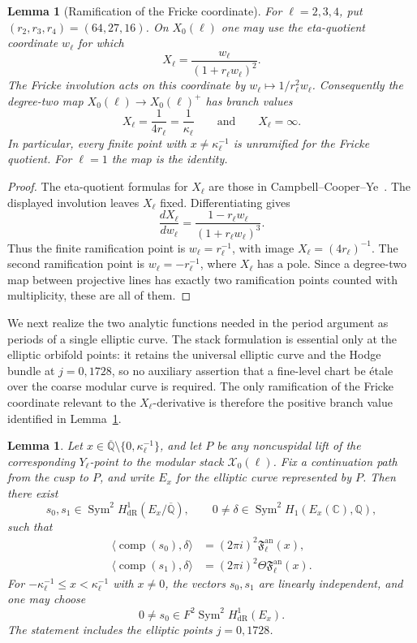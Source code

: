 \documentclass[11pt,a4paper]{amsart} %
\newtheorem{lemma}[theorem]{Lemma}
\theoremstyle{definition}
\newcommand{\Q}{\mathbb Q}
\newcommand{\Qbar}{\overline{\mathbb Q}}
\newcommand{\C}{\mathbb C}
\newcommand{\Sym}{\operatorname{Sym}}
\newcommand{\dR}{\mathrm{dR}}
\begin{document}
\begin{lemma}[Ramification of the Fricke coordinate]\label{lem:frickeram}
For \(\ell=2,3,4\), put $(r_2,r_3,r_4)=(64,27,16)$. On \(X_0(\ell)\) one may use the eta-quotient coordinate \(w_\ell\) for which
\[
X_\ell=\frac{w_\ell}{(1+r_\ell w_\ell)^2}.
\]
The Fricke involution acts on this coordinate by $w_\ell\longmapsto {1}/{r_\ell^2w_\ell}$. Consequently the degree-two map $X_0(\ell)\longrightarrow X_0(\ell)^+$ has branch values
\[
X_\ell=\frac{1}{4r_\ell}=\frac1{\kappa_\ell}
\qquad\text{and}\qquad
X_\ell=\infty.
\]
In particular, every finite point with $x\ne\kappa_\ell^{-1}$ is unramified for the Fricke quotient. For \(\ell=1\) the map is the identity.
\end{lemma}

\begin{proof}
The eta-quotient formulas for \(X_\ell\) are those in
Campbell--Cooper--Ye~\cite[Table~2]{CCY}. The displayed involution leaves
\(X_\ell\) fixed. Differentiating gives
\[
\frac{dX_\ell}{dw_\ell}
=
\frac{1-r_\ell w_\ell}{(1+r_\ell w_\ell)^3}.
\]
Thus the finite ramification point is \(w_\ell=r_\ell^{-1}\), with image
\(X_\ell=(4r_\ell)^{-1}\). The second ramification point is
\(w_\ell=-r_\ell^{-1}\), where \(X_\ell\) has a pole. Since a degree-two map
between projective lines has exactly two ramification points counted with
multiplicity, these are all of them.
\end{proof}

We next realize the two analytic functions needed in the period argument as
periods of a single elliptic curve. The stack formulation is essential only
at the elliptic orbifold points: it retains the universal elliptic curve and
the Hodge bundle at \(j=0,1728\), so no auxiliary assertion that a fine-level
chart be étale over the coarse modular curve is required. The only
ramification of the Fricke coordinate relevant to the \(X_\ell\)-derivative
is therefore the positive branch value identified in
Lemma~\ref{lem:frickeram}.

\begin{lemma}\label{lem:period}
Let \(x\in\Qbar\setminus\{0,\kappa_\ell^{-1}\}\), and let \(P\) be any
noncuspidal lift of the corresponding \(Y_\ell\)-point to the modular stack
\(\mathcal X_0(\ell)\). Fix a continuation path from the cusp to \(P\), and
write \(E_x\) for the elliptic curve represented by \(P\). Then there exist
\[
s_0,s_1\in\Sym^2H^1_{\dR}(E_x/\Qbar),
\qquad
0\ne\delta\in\Sym^2H_1(E_x(\C),\Q),
\]
such that
\begin{align*}
\langle\operatorname{comp}(s_0),\delta\rangle
&=(2\pi i)^2{\mathfrak F}^{\mathrm{an}}_\ell(x),\\
\langle\operatorname{comp}(s_1),\delta\rangle
&=(2\pi i)^2\Theta{\mathfrak F}^{\mathrm{an}}_\ell(x).
\end{align*}
For
\(-\kappa_\ell^{-1}\le x<\kappa_\ell^{-1}\) with \(x\ne0\), the vectors
\(s_0,s_1\) are linearly independent, and one may choose
\[
0\ne s_0\in F^2\Sym^2H^1_{\dR}(E_x).
\]
The statement includes the elliptic points \(j=0,1728\).
\end{lemma}
\end{document}
